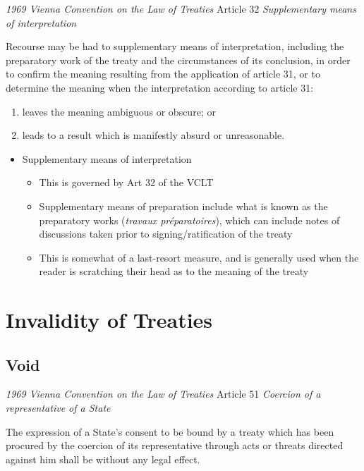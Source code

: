 \begin{conventiondetails}{\textit{1969 Vienna Convention on the Law of Treaties} Article 32}
    \flushleft
    \textit{Supplementary means of interpretation}

    \vspace{\baselineskip}

    Recourse may be had to supplementary means of interpretation, including the preparatory work of the treaty and the circumstances of its conclusion, in order to confirm the meaning resulting from the application of article 31, or to determine the meaning when the interpretation according to article 31:
    \begin{enumerate}[label=(\alph*)]
        \item leaves the meaning ambiguous or obscure; or 
        \item leads to a result which is manifestly absurd or unreasonable.
    \end{enumerate}
\end{conventiondetails}

\begin{itemize}
    \item Supplementary means of interpretation
    \begin{itemize}
        \item This is governed by Art 32 of the VCLT
        \item Supplementary means of preparation include what is known as the preparatory works (\textit{travaux préparatoires}), which can include notes of discussions taken prior to signing/ratification of the treaty
        \item This is somewhat of a last-resort measure, and is generally used when the reader is scratching their head as to the meaning of the treaty
    \end{itemize}
\end{itemize}

\section{Invalidity of Treaties}
\subsection{Void}
\begin{conventiondetails}{\textit{1969 Vienna Convention on the Law of Treaties} Article 51}
    \flushleft
    \textit{Coercion of a representative of a State}

    \vspace{\baselineskip}

    The expression of a State's consent to be bound by a treaty which has been procured by the  coercion of its representative through acts or threats directed against him shall be without any legal  effect.
\end{conventiondetails}

